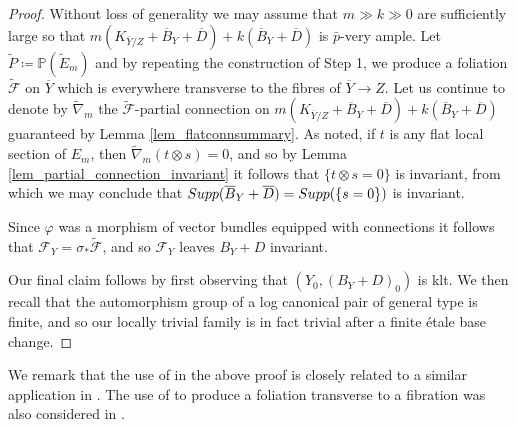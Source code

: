 \documentclass[12pt]{amsart}
\theoremstyle{plain}
\theoremstyle{definition}
\begin{document}
\begin{proof}
Without loss of generality 
we may assume that $m \gg k \gg 0$ are sufficiently large 
so that $m(K_{\overline Y/Z}+\overline{B}_Y+\overline{D})+k(\overline{B}_Y+\overline{D})$
is $\bar{p}$-very ample.  Let $\tilde{P} \coloneqq \mathbb P(\tilde{E}_m)$ and by repeating the 
construction of Step 1, we produce a foliation $\tilde{\mathcal F}$ on $\overline{Y}$ which is
everywhere transverse to the fibres of $\overline{Y} \rightarrow Z$.  
Let us continue to denote by $\tilde{\nabla}_m$ the $\tilde{\mathcal F}$-partial connection on 
$m(K_{\overline Y/Z}+\overline{B}_Y+\overline{D})+k(\overline{B}_Y+\overline{D})$ guaranteed by Lemma 
\ref{lem_flatconnsummary}.  As noted, if $t$ is any flat local
section of $E_m$, then $\tilde{\nabla}_m(t\otimes s) = 0$, and so by 
Lemma \ref{lem_partial_connection_invariant} it follows that $\{t\otimes s = 0\}$ is invariant, from 
which we may conclude that ${\rm Supp}(\overline{B}_Y+\overline{D}) = {\rm Supp}(\{s = 0\})$ is invariant.

Since $\varphi$ was a morphism of vector bundles equipped with connections it follows that 
$\mathcal F_Y = \sigma_*\tilde{\mathcal F}$, and so $\mathcal F_Y$ leaves $B_Y+D$ invariant. 
\medskip

Our final claim follows by first observing that $(Y_0, (B_Y+D)_0)$
is klt.  We then recall that the automorphism group of a log canonical pair of general type
is finite, and so our locally trivial family is in fact trivial after a finite \'etale base change.
\end{proof}



We remark that the use of \cite{Simpson92} in the above proof is closely related to a similar application in 
\cite{MR3959071}.  The use of \cite{Simpson92} to produce a foliation transverse to a fibration
was also considered in \cite{Ou21}. 
\end{document}
